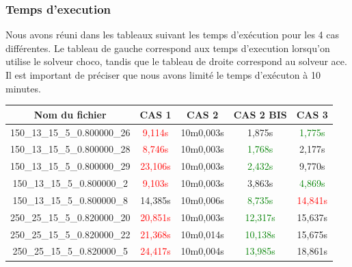 \documentclass[a4paper, 10pt]{article}
\begin{document}
      \subsubsection{Temps d'execution}

        Nous avons réuni dans les tableaux suivant les temps d'exécution pour les 4 cas différentes. Le tableau de gauche correspond aux temps d'execution lorsqu'on utilise le solveur choco, tandis que le tableau de droite correspond au solveur ace. Il est important de préciser que nous avons limité le temps d'exécuton à 10 minutes.

        \begin{minipage}[t]{0.5\linewidth}
          \footnotesize
          \begin{tabular}{ |c|c|c|c|c| }
            \hline
            \textbf{Nom du fichier} & \textbf{CAS 1} & \textcolor[gray]{0.6}{\textbf{CAS 2}}   & \textbf{CAS 2 BIS} & \textbf{CAS 3} \\
            \hline
            \scriptsize{150\_13\_15\_5\_0.800000\_26} & \textcolor{red}{9,114s} & \textcolor[gray]{0.6}{ 10m0,003s} & 1,875s& \textcolor{green}{1,775s}\\
            \hline
            \scriptsize{150\_13\_15\_5\_0.800000\_28} & \textcolor{red}{8,746s} & \textcolor[gray]{0.6}{ 10m0,003s} & \textcolor{green}{1,768s} & 2,177s \\
            \hline
            \scriptsize{150\_13\_15\_5\_0.800000\_29} &\textcolor{red}{ 23,106s} & \textcolor[gray]{0.6}{ 10m0,003s} & \textcolor{green}{2,432s} & 9,770s \\
            \hline
            \scriptsize{150\_13\_15\_5\_0.800000\_2} & \textcolor{red}{9,103s} & \textcolor[gray]{0.6}{ 10m0,003s} & 3,863s & \textcolor{green}{4,869s} \\
            \hline
            \scriptsize{150\_13\_15\_5\_0.800000\_8} & 14,385s & \textcolor[gray]{0.6}{ 10m0,006s} & \textcolor{green}{8,735s} & \textcolor{red}{14,841s}\\
            \hline
            \scriptsize{250\_25\_15\_5\_0.820000\_20} & \textcolor{red}{20,851s} & \textcolor[gray]{0.6}{ 10m0,003s} & \textcolor{green}{12,317s} & 15,637s \\
            \hline
            \scriptsize{250\_25\_15\_5\_0.820000\_22} &\textcolor{red}{ 21,368s} & \textcolor[gray]{0.6}{ 10m0,014s} & \textcolor{green}{10,138s} & 15,675s \\
            \hline
            \scriptsize{250\_25\_15\_5\_0.820000\_5} & \textcolor{red}{24,417s} & \textcolor[gray]{0.6}{ 10m0,004s} & \textcolor{green}{13,985s} & 18,861s \\

\end{tabular}
\end{minipage}
\end{document}
